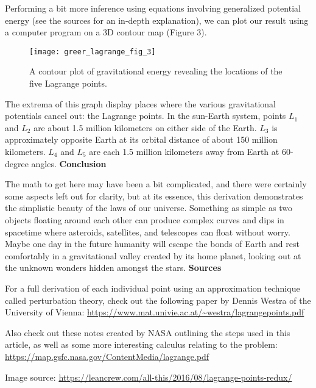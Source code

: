 Performing a bit more inference using equations involving generalized potential energy (see the sources for an in-depth explanation), we can plot our result using a computer program on a 3D contour map (Figure 3).

\renewcommand{\thefigure}{3}
\begin{figure}[h]
  \begin{center}
    \texttt{[image: greer\_lagrange\_fig\_3]}
  \end{center}
  \caption{A contour plot of gravitational energy revealing the locations of the five Lagrange points.}
  \label{fig:3}
\end{figure}

The extrema of this graph display places where the various gravitational potentials cancel out: the Lagrange points. In the sun-Earth system, points $L_1$ and $L_2$ are about 1.5 million kilometers on either side of the Earth. $L_3$ is approximately opposite Earth at its orbital distance of about 150 million kilometers. $L_4$ and $L_5$ are each 1.5 million kilometers away from Earth at 60-degree angles.
\newline\newline
\textbf{Conclusion}

The math to get here may have been a bit complicated, and there were certainly some aspects left out for clarity, but at its essence, this derivation demonstrates the simplistic beauty of the laws of our universe. Something as simple as two objects floating around each other can produce complex curves and dips in spacetime where asteroids, satellites, and telescopes can float without worry. Maybe one day in the future humanity will escape the bonds of Earth and rest comfortably in a gravitational valley created by its home planet, looking out at the unknown wonders hidden amongst the stars. 
\newline\newline
\textbf{Sources}

For a full derivation of each individual point using an approximation technique called perturbation theory, check out the following paper by Dennis Westra of the University of Vienna: 
\newline\url{https://www.mat.univie.ac.at/~westra/lagrangepoints.pdf}

Also check out these notes created by NASA outlining the steps used in this article, as well as some more interesting calculus relating to the problem:
\newline\url{https://map.gsfc.nasa.gov/ContentMedia/lagrange.pdf}

Image source: 
\newline\url{https://leancrew.com/all-this/2016/08/lagrange-points-redux/}